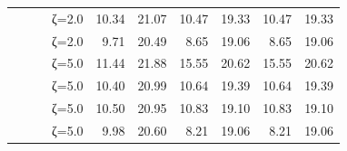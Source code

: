 \begin{table}[htbp]
\begin{tabular}{ll r l  rr  rr  rr}
  &  &  & ζ=2.0 & 10.34 & 21.07 & 10.47 & 19.33 & 10.47 & 19.33 \\
  &  &  & ζ=2.0 & 9.71 & 20.49 & 8.65 & 19.06 & 8.65 & 19.06 \\
  &  &  & ζ=5.0 & 11.44 & 21.88 & 15.55 & 20.62 & 15.55 & 20.62 \\
  &  &  & ζ=5.0 & 10.40 & 20.99 & 10.64 & 19.39 & 10.64 & 19.39 \\
  &  &  & ζ=5.0 & 10.50 & 20.95 & 10.83 & 19.10 & 10.83 & 19.10 \\
  &  &  & ζ=5.0 & 9.98 & 20.60 & 8.21 & 19.06 & 8.21 & 19.06 \\
\bottomrule
\end{tabular}
\end{table}